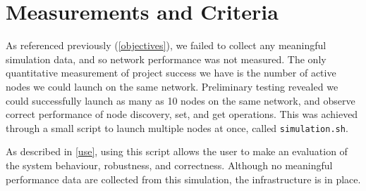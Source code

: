 \documentclass[12pt]{report}
\newcommand{\code}[1]{\colorbox{codegray}{\texttt{#1}}}
\begin{document}
    \section{Measurements and Criteria}
    As referenced previously (\ref{objectives}), we failed to collect any
    meaningful simulation data, and so network performance was not measured.
    The only quantitative measurement of project success we have is the number
    of active nodes we could launch on the same network.  Preliminary testing
    revealed we could successfully launch as many as 10 nodes on the same
    network, and observe correct performance of node discovery, set, and get
    operations.  This was achieved through a small script to launch multiple
    nodes at once, called \code{simulation.sh}.

    As described in \ref{use}, using this script allows the user to make an
    evaluation of the system behaviour, robustness, and correctness.  Although
    no meaningful performance data are collected from this simulation, the
    infrastructure is in place.  
\end{document}
